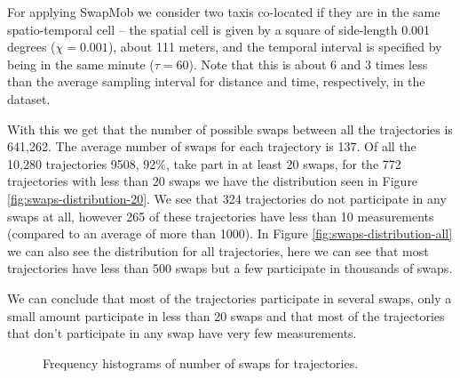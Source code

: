 \documentclass[review]{elsarticle}
\begin{document}
For applying SwapMob we consider two taxis co-located if they are in
the same spatio-temporal cell -- the spatial cell is given by a square of side-length 0.001 degrees ($\chi = 0.001$), about 111
meters, and the temporal interval is specified by being in the same minute ($\tau = 60$). 
Note that this is about 6 and 3 times less than the average sampling interval for distance and time, respectively, 
in the dataset.

With this we get that the number of possible swaps between all the
trajectories is 641,262. The average number of swaps for each
trajectory is 137. Of all the 10,280 trajectories 9508, 92\%, take part
in at least 20 swaps, for the 772 trajectories with less than 20 swaps
we have the distribution seen in Figure
\ref{fig:swaps-distribution-20}. We see that 324 trajectories do not
participate in any swaps at all, however 265 of these trajectories
have less than 10 measurements (compared to an average of more than
1000). In Figure \ref{fig:swaps-distribution-all} we can also see the
distribution for all trajectories, here we can see that most
trajectories have less than 500 swaps but a few participate in
thousands of swaps.

We can conclude that most of the trajectories participate in several
swaps, only a small amount participate in less than 20 swaps and that
most of the trajectories that don't participate in any swap have very
few measurements.

\begin{figure}
  \hfil
  \caption{Frequency histograms of number of swaps for trajectories.}
  \label{fig:swaps-distribution}
\end{figure}
\end{document}
